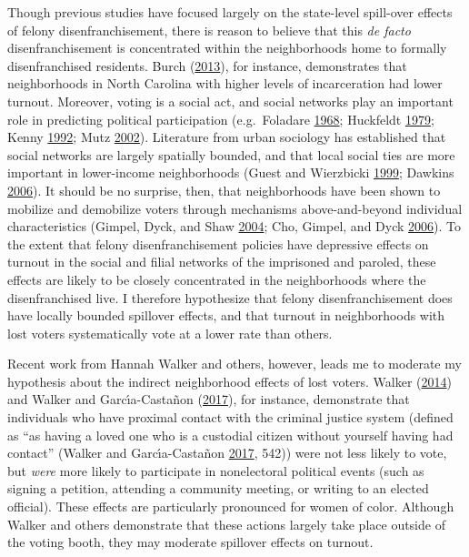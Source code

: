 \documentclass[12pt,]{article}
\begin{document}
Though previous studies have focused largely on the state-level spill-over effects of felony disenfranchisement, there is reason to believe that this \emph{de facto} disenfranchisement is concentrated within the neighborhoods home to formally disenfranchised residents. Burch (\protect\hyperlink{ref-Burch2013}{2013}), for instance, demonstrates that neighborhoods in North Carolina with higher levels of incarceration had lower turnout. Moreover, voting is a social act, and social networks play an important role in predicting political participation (e.g.~Foladare \protect\hyperlink{ref-Foladare1968}{1968}; Huckfeldt \protect\hyperlink{ref-Huckfeldt1979}{1979}; Kenny \protect\hyperlink{ref-Kenny1992}{1992}; Mutz \protect\hyperlink{ref-Mutz2002}{2002}). Literature from urban sociology has established that social networks are largely spatially bounded, and that local social ties are more important in lower-income neighborhoods (Guest and Wierzbicki \protect\hyperlink{ref-Guest1999}{1999}; Dawkins \protect\hyperlink{ref-Dawkins2006}{2006}). It should be no surprise, then, that neighborhoods have been shown to mobilize and demobilize voters through mechanisms above-and-beyond individual characteristics (Gimpel, Dyck, and Shaw \protect\hyperlink{ref-Gimpel2004}{2004}; Cho, Gimpel, and Dyck \protect\hyperlink{ref-Cho2006}{2006}). To the extent that felony disenfranchisement policies have depressive effects on turnout in the social and filial networks of the imprisoned and paroled, these effects are likely to be closely concentrated in the neighborhoods where the disenfranchised live. I therefore hypothesize that felony disenfranchisement does have locally bounded spillover effects, and that turnout in neighborhoods with lost voters systematically vote at a lower rate than others.

Recent work from Hannah Walker and others, however, leads me to moderate my hypothesis about the indirect neighborhood effects of lost voters. Walker (\protect\hyperlink{ref-Walker2014}{2014}) and Walker and Garcı́a-Castañon (\protect\hyperlink{ref-Walker2017}{2017}), for instance, demonstrate that individuals who have proximal contact with the criminal justice system (defined as ``as having a loved one who is a custodial citizen without yourself having had contact'' (Walker and Garcı́a-Castañon \protect\hyperlink{ref-Walker2017}{2017}, 542)) were not less likely to vote, but \emph{were} more likely to participate in nonelectoral political events (such as signing a petition, attending a community meeting, or writing to an elected official). These effects are particularly pronounced for women of color. Although Walker and others demonstrate that these actions largely take place outside of the voting booth, they may moderate spillover effects on turnout.
\end{document}
